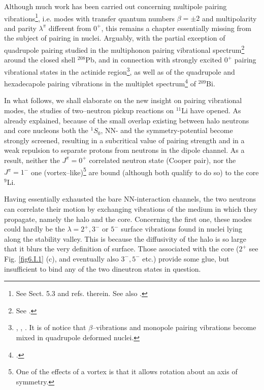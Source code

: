 \begin{subappendices}
Although much work has been carried out concerning multipole pairing vibrations\footnote{See \cite{Brink:05} Sect. 5.3 and refs. therein. See also \cite{Bes:71}.}, i.e. modes with transfer quantum numbers $\beta=\pm2$ and multipolarity and parity $\lambda^\pi$ different from $0^+$, this remains a chapter essentially missing from the subject of pairing in nuclei. Arguably, with the partial exception of quadrupole pairing studied in the multiphonon pairing vibrational spectrum\footnote{See \cite{Flynn:72}.} around the closed shell $^{208}$Pb, and in connection with strongly excited $0^+$ pairing vibrational states in the actinide region\footnote{\cite{Casten:72}, \cite{Bes:72}, \cite{Ragnarsson:76}. It is of notice that $\beta$--vibrations and monopole pairing vibrations become mixed in quadrupole deformed nuclei.}, as well as of the quadrupole and hexadecapole pairing vibrations in the multiplet spectrum\footnote{\cite{Bortignon:76}.} of $^{209}$Bi.

In what follows, we shall elaborate on the new insight on pairing vibrational modes, the studies of two--neutron pickup reactions on $^{11}$Li have opened. As already explained, because of the small overlap existing between halo neutrons and core nucleons both the $^1S_0$, NN- and the symmetry-potential become strongly screened, resulting in a subcritical value of pairing strength and in a weak repulsion to separate protons from neutrons in the dipole channel.
As a result, neither the $J^{\pi}=0^+$ correlated neutron state  (Cooper pair), nor the $J^\pi=1^-$ one (vortex--like)\footnote{One of the effects of a vortex is that it allows rotation about an axis of symmetry.} are bound 
(although both qualify to do so) to the core $^{9}$Li. 


Having essentially exhausted the bare NN-interaction channels, the two neutrons can correlate their motion by exchanging vibrations of the medium in which they propagate, namely  the halo and the core. Concerning the first one, these modes could hardly  be the $\lambda= 2^+,3^-$ or $5^-$ surface vibrations found in 
nuclei lying along the  stability valley. This is because the diffusivity of the halo is so large that it blurs the very definition of surface. Those associated with  the core ($ 2^+$ see Fig. \ref{fig6.I.1} (c), and eventually also $3^-,5^-$ etc.) provide some glue, but insufficient to bind any of the two dineutron states in question.


\end{subappendices}
